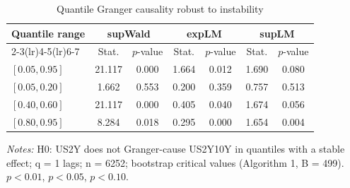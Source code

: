 \begin{table}[htbp]\centering
\caption{Quantile Granger causality robust to instability}\label{tab:qgc}
\begin{tabular}{lcccccc}
\toprule
Quantile range & \multicolumn{2}{c}{supWald} & \multicolumn{2}{c}{expLM} & \multicolumn{2}{c}{supLM} \\
\cmidrule(lr){2-3}\cmidrule(lr){4-5}\cmidrule(lr){6-7}
 & Stat. & $p$-value & Stat. & $p$-value & Stat. & $p$-value \\
\midrule
$[0.05, 0.95]$ & 21.117\sym{***} & 0.000 & 1.664\sym{**} & 0.012 & 1.690\sym{*} & 0.080 \\
$[0.05, 0.20]$ & 1.662 & 0.553 & 0.200 & 0.359 & 0.757 & 0.513 \\
$[0.40, 0.60]$ & 21.117\sym{***} & 0.000 & 0.405\sym{**} & 0.040 & 1.674\sym{*} & 0.056 \\
$[0.80, 0.95]$ & 8.284\sym{**} & 0.018 & 0.295\sym{***} & 0.000 & 1.654\sym{***} & 0.004 \\
\bottomrule
\end{tabular}
\par\smallskip\begin{minipage}{0.95\linewidth}\footnotesize\textit{Notes:} H0: US2Y does not Granger-cause US2Y10Y in quantiles with a stable effect; q = 1 lags; n = 6252; bootstrap critical values (Algorithm 1, B = 499). \sym{***} $p<0.01$, \sym{**} $p<0.05$, \sym{*} $p<0.10$.\end{minipage}
\end{table}